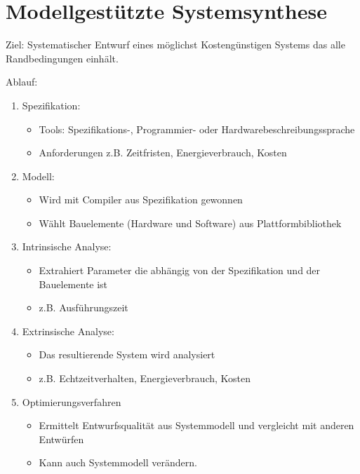 \chapter{Modellgestützte Systemsynthese}
Ziel: Systematischer Entwurf eines möglichst Kostengünstigen Systems das alle 
Randbedingungen einhält.

Ablauf:
\begin{enumerate}
    \item Spezifikation:
        \begin{itemize}
            \item Tools: Spezifikations-, Programmier- oder Hardwarebeschreibungssprache
            \item Anforderungen z.B. Zeitfristen, Energieverbrauch, Kosten
        \end{itemize}
    \item Modell:
        \begin{itemize}
            \item Wird mit Compiler aus Spezifikation gewonnen
            \item Wählt Bauelemente (Hardware und Software) aus Plattformbibliothek
        \end{itemize}
    \item Intrinsische Analyse: 
        \begin{itemize} 
            \item Extrahiert Parameter die abhängig von der Spezifikation und der Bauelemente ist
            \item z.B. Ausführungszeit
        \end{itemize}
    \item Extrinsische Analyse: 
        \begin{itemize}
            \item Das resultierende System wird analysiert
            \item z.B. Echtzeitverhalten, Energieverbrauch, Kosten
        \end{itemize}
    \item Optimierungsverfahren
        \begin{itemize}
            \item Ermittelt Entwurfsqualität aus Systemmodell und vergleicht mit anderen Entwürfen
            \item Kann auch Systemmodell verändern.
        \end{itemize}
\end{enumerate}

